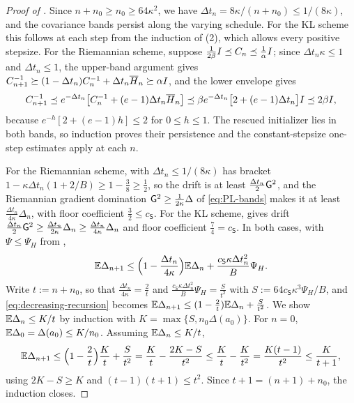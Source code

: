 \begin{proof}[Proof of ]
Since $n+n_0\geq n_0\geq64\kappa^2$, we have $\Delta t_n=8\kappa/(n+n_0)\leq1/(8\kappa)$, and the
covariance bands persist along the varying schedule. For the KL scheme this follows at each step from
the induction of (2), which allows every positive stepsize. For the Riemannian
scheme, suppose $\tfrac1{2\beta}I\preceq C_n\preceq\tfrac1\alpha I$; since $\Delta t_n\kappa\leq1$
and $\Delta t_n\leq1$, the upper-band argument gives
$C_{n+1}^{-1}\succeq(1-\Delta t_n)C_n^{-1}+\Delta t_n\overline H_n\succeq\alpha I$, and the lower
envelope gives
\[
    C_{n+1}^{-1}\preceq e^{-\Delta t_n}\bigl[C_n^{-1}+(e-1)\Delta t_n\overline H_n\bigr]
    \preceq\beta e^{-\Delta t_n}\bigl[2+(e-1)\Delta t_n\bigr]I\preceq2\beta I,
\]
because $e^{-h}[2+(e-1)h]\leq2$ for $0\leq h\leq1$. The rescued initializer lies in both bands, so
induction proves their persistence and the constant-stepsize one-step estimates apply at each $n$.

For the Riemannian scheme,  with $\Delta t_n\leq1/(8\kappa)$ has bracket
$1-\kappa\Delta t_n(1+2/B)\geq1-\tfrac38\geq\tfrac12$, so the drift is at least
$\tfrac{\Delta t_n}2\mathsf{G}^2$, and the Riemannian gradient domination
$\mathsf{G}^2\geq\tfrac1{2\kappa}\Delta$ of \eqref{eq:PL-bands} makes it at least
$\tfrac{\Delta t_n}{4\kappa}\Delta_n$, with floor coefficient $\tfrac32\leq c_{\mathsf S}$. For the KL
scheme,  gives drift
$\tfrac{\Delta t_n}2\mathsf{G}^2\geq\tfrac{\Delta t_n}{2\kappa}\Delta_n\geq\tfrac{\Delta t_n}{4\kappa}\Delta_n$
and floor coefficient $\tfrac74=c_{\mathsf S}$. In both cases, with $\Psi\leq\Psi_H$ from
,
\begin{equation}
\label{eq:decreasing-recursion}
    \mathbb{E}\Delta_{n+1}\leq\Bigl(1-\frac{\Delta t_n}{4\kappa}\Bigr)\mathbb{E}\Delta_n+\frac{c_{\mathsf S}\kappa\Delta t_n^2}B\Psi_H .
\end{equation}
Write $t:=n+n_0$, so that $\tfrac{\Delta t_n}{4\kappa}=\tfrac2t$ and
$\tfrac{c_{\mathsf S}\kappa\Delta t_n^2}B\Psi_H=\tfrac S{t^2}$ with
$S:=64c_{\mathsf S}\kappa^3\Psi_H/B$, and \eqref{eq:decreasing-recursion} becomes
$\mathbb{E}\Delta_{n+1}\leq(1-\tfrac2t)\mathbb{E}\Delta_n+\tfrac S{t^2}$. We show $\mathbb{E}\Delta_n\leq K/t$ by induction
with $K=\max\{S,n_0\Delta(a_0)\}$. For $n=0$, $\mathbb{E}\Delta_0=\Delta(a_0)\leq K/n_0$. Assuming
$\mathbb{E}\Delta_n\leq K/t$,
\[
    \mathbb{E}\Delta_{n+1}\leq\Bigl(1-\frac2t\Bigr)\frac Kt+\frac S{t^2}
    =\frac Kt-\frac{2K-S}{t^2}
    \leq\frac Kt-\frac K{t^2}
    =\frac{K(t-1)}{t^2}
    \leq\frac K{t+1},
\]
using $2K-S\geq K$ and $(t-1)(t+1)\leq t^2$. Since $t+1=(n+1)+n_0$, the induction closes.
\end{proof}

